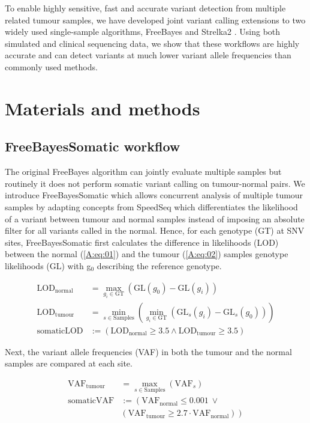 To enable highly sensitive, fast and accurate variant detection from multiple related tumour samples, we have developed joint variant calling extensions to two widely used single-sample algorithms, FreeBayes \parencite{Garrison2012} and Strelka2 \parencite{Kim2018}. Using both simulated and clinical sequencing data, we show that these workflows are highly accurate and can detect variants at much lower variant allele frequencies than commonly used methods.

\section{Materials and methods}
\subsection{FreeBayesSomatic workflow}
The original FreeBayes algorithm can jointly evaluate multiple samples but routinely it does not perform somatic variant calling on tumour-normal pairs. We introduce FreeBayesSomatic which allows concurrent analysis of multiple tumour samples by adapting concepts from SpeedSeq \parencite{Chiang2015} which differentiates the likelihood of a variant between tumour and normal samples instead of imposing an absolute filter for all variants called in the normal. Hence, for each genotype (GT) at SNV sites, FreeBayesSomatic first calculates the difference in likelihoods (LOD) between the normal (\autoref{A:eq:01}) and the tumour (\autoref{A:eq:02}) samples genotype likelihoods (GL) with g$_{0}$ describing the reference genotype.


\begin{align}
\text{LOD}_{\text{normal}} &= \max_{g_i \in \text{GT}} \left( \text{GL}(g_0) - \text{GL}(g_i) \right) \label{A:eq:01}\\
\text{LOD}_{\text{tumour}} &= \min_{s \in \text{Samples}} \left( \min_{g_i \in \text{GT}} \left( \text{GL}_s(g_i) - \text{GL}_s(g_0) \right) \right) \label{A:eq:02}\\
\text{somaticLOD} & := \left( \text{LOD}_{\text{normal}} \geq 3.5 \land \text{LOD}_{\text{tumour}} \geq 3.5 \right) \label{A:eq:03}
\end{align}

Next, the variant allele frequencies (VAF) in both the tumour and the normal samples are compared at each site.


\begin{align}
\text{VAF}_{\text{tumour}} &= \max_{s \in \text{Samples}} ( \text{VAF}_s) \label{A:eq:04}\\
\text{somaticVAF} & := \left( \text{VAF}_{\text{normal}} \leq 0.001 ~\lor \right. \nonumber \\
 & \left. ( \text{VAF}_{\text{tumour}} \geq 2.7 \cdot \text{VAF}_{\text{normal}}) \right) \label{A:eq:05}
\end{align}


